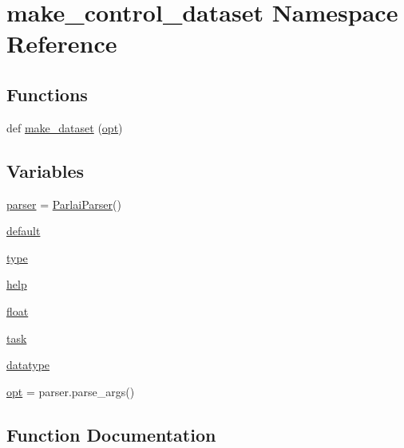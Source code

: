 \hypertarget{namespacemake__control__dataset}{}\section{make\+\_\+control\+\_\+dataset Namespace Reference}
\label{namespacemake__control__dataset}
\subsection*{Functions}
\begin{DoxyCompactItemize}
\item 
def \hyperlink{namespacemake__control__dataset_ab015bf05433a8280052368fd2b16ec1b}{make\+\_\+dataset} (\hyperlink{namespacemake__control__dataset_a5734aed44453af52d00654a8354f3c70}{opt})
\end{DoxyCompactItemize}
\subsection*{Variables}
\begin{DoxyCompactItemize}
\item 
\hyperlink{namespacemake__control__dataset_a88e7dbb267b6ad85a78a32e5cbc6d6b3}{parser} = \hyperlink{classparlai_1_1core_1_1params_1_1ParlaiParser}{Parlai\+Parser}()
\item 
\hyperlink{namespacemake__control__dataset_a101312d758846f5888c8abfb7cdc6037}{default}
\item 
\hyperlink{namespacemake__control__dataset_a125716dd777900393412f543c184fe84}{type}
\item 
\hyperlink{namespacemake__control__dataset_a4d27f074058d5a41fe891d6de932ee2a}{help}
\item 
\hyperlink{namespacemake__control__dataset_aab4734ca3fc74fda1c53ad21ec9f47b0}{float}
\item 
\hyperlink{namespacemake__control__dataset_add21273b919715237521481445793a1a}{task}
\item 
\hyperlink{namespacemake__control__dataset_a98700f4d0d81fda1d8b0965cb134c7df}{datatype}
\item 
\hyperlink{namespacemake__control__dataset_a5734aed44453af52d00654a8354f3c70}{opt} = parser.\+parse\+\_\+args()
\end{DoxyCompactItemize}


\subsection{Function Documentation}
\mbox{\label{namespacemake__control__dataset_ab015bf05433a8280052368fd2b16ec1b}} 

